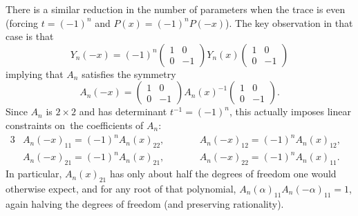 \documentclass[pdftex]{sigma}
\theoremstyle{definition}
\numberwithin{equation}{section}
\begin{document}
There is a similar reduction in the number of parameters when the trace is
even (forcing $t=(-1)^n$ and $P(x)=(-1)^n P(-x)$). The key observation in that case
is that
\[
Y_n(-x) = (-1)^n \begin{pmatrix} 1 & 0 \\ 0 & -1\end{pmatrix}Y_n(x)
 \begin{pmatrix} 1 & 0 \\ 0 & -1\end{pmatrix}
\]
implying that $A_n$ satisfies the symmetry
\[
A_n(-x)
=
\begin{pmatrix} 1 & 0 \\ 0 & -1\end{pmatrix}
A_n(x)^{-1}
\begin{pmatrix} 1 & 0 \\ 0 & -1\end{pmatrix} .
\]
Since $A_n$ is $2\times 2$ and has determinant $t^{-1}=(-1)^n$, this actually
imposes linear constraints on~the coefficients of $A_n$:
\begin{alignat*}{3}
&A_n(-x)_{11} = (-1)^n A_n(x)_{22},\qquad&&
A_n(-x)_{12} = (-1)^n A_n(x)_{12},&\\
&A_n(-x)_{21} = (-1)^n A_n(x)_{21},\qquad&&
A_n(-x)_{22} = (-1)^n A_n(x)_{11}.&
\end{alignat*}
In particular, $A_n(x)_{21}$ has only about half the degrees of freedom one
would otherwise expect, and for any root of that polynomial,
$A_n(\alpha)_{11}A_n(-\alpha)_{11}=1$, again halving the degrees of freedom (and
preserving rationality).
\end{document}
